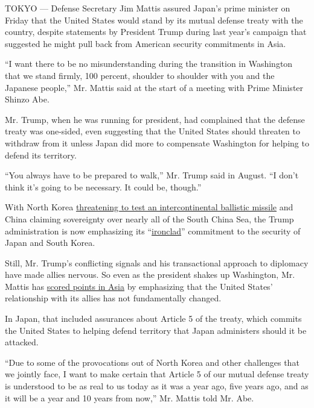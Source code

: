 TOKYO --- Defense Secretary Jim Mattis assured Japan's prime minister on
Friday that the United States would stand by its mutual defense treaty
with the country, despite statements by President Trump during last
year's campaign that suggested he might pull back from American security
commitments in Asia.

``I want there to be no misunderstanding during the transition in
Washington that we stand firmly, 100 percent, shoulder to shoulder with
you and the Japanese people,'' Mr. Mattis said at the start of a meeting
with Prime Minister Shinzo Abe.

Mr. Trump, when he was running for president, had complained that the
defense treaty was one-sided, even suggesting that the United States
should threaten to withdraw from it unless Japan did more to compensate
Washington for helping to defend its territory.

``You always have to be prepared to walk,'' Mr. Trump said in August.
``I don't think it's going to be necessary. It could be, though.''

With North Korea
\href{https://www.nytimes.com/2017/01/01/world/asia/north-korea-intercontinental-ballistic-missile-test-kim-jong-un.html}{threatening
to test an intercontinental ballistic missile} and China claiming
sovereignty over nearly all of the South China Sea, the Trump
administration is now emphasizing its
``\href{https://www.nytimes.com/reuters/2017/01/28/world/asia/28reuters-usa-trump-japan-whitehouse.html}{ironclad}''
commitment to the security of Japan and South Korea.

Still, Mr. Trump's conflicting signals and his transactional approach to
diplomacy have made allies nervous. So even as the president shakes up
Washington, Mr. Mattis has
\href{https://www.nytimes.com/2017/02/02/world/asia/james-mattis-us-korea-thaad.html}{scored
points in Asia} by emphasizing that the United States' relationship with
its allies has not fundamentally changed.

In Japan, that included assurances about Article 5 of the treaty, which
commits the United States to helping defend territory that Japan
administers should it be attacked.

``Due to some of the provocations out of North Korea and other
challenges that we jointly face, I want to make certain that Article 5
of our mutual defense treaty is understood to be as real to us today as
it was a year ago, five years ago, and as it will be a year and 10 years
from now,'' Mr. Mattis told Mr. Abe.

